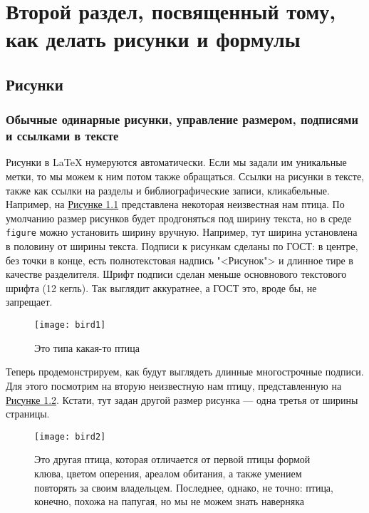 \chapter{Второй раздел, посвященный тому, как делать рисунки и формулы}
\label{ch:chap2}

\section{Рисунки}
\label{sec:fig}

\subsection{Обычные одинарные рисунки, управление размером, подписями и ссылками в тексте}
\label{subsec:simp-fig}

Рисунки в \LaTeX{} нумеруются автоматически. Если мы задали им уникальные метки, то мы можем к ним потом также обращаться. Ссылки на рисунки в тексте, также как ссылки на разделы и библиографические записи, кликабельные. Например, на \hyperref[fig:bird1]{Рисунке \ref*{fig:bird1}} представлена некоторая неизвестная нам птица. По умолчанию размер рисунков будет продгоняться под ширину текста, но в среде \verb|figure| можно установить ширину вручную. Например, тут ширина установлена в половину от ширины текста. Подписи к рисункам сделаны по ГОСТ: в центре, без точки в конце, есть полнотекстовая надпись "<Рисунок"> и длинное тире в качестве разделителя. Шрифт подписи сделан меньше основнового текстового шрифта (12 кегль). Так выглядит аккуратнее, а ГОСТ это, вроде бы, не запрещает.

    \begin{figure}[ht]
        \centering
        \texttt{[image: bird1]}
        \caption{Это типа какая-то птица}
        \label{fig:bird1}
    \end{figure}

Теперь продемонстрируем, как будут выглядеть длинные многострочные подписи. Для этого посмотрим на вторую неизвестную нам птицу, представленную на \hyperref[fig:bird2]{Рисунке \ref*{fig:bird2}}. Кстати, тут задан другой размер рисунка --- одна третья от ширины страницы.

    \begin{figure}[ht]
        \centering
        \texttt{[image: bird2]}
        \caption{Это другая птица, которая отличается от первой птицы формой клюва, цветом оперения, ареалом обитания, а также умением повторять за своим владельцем. Последнее, однако, не точно: птица, конечно, похожа на папугая, но мы не можем знать наверняка}
        \label{fig:bird2}
    \end{figure}

